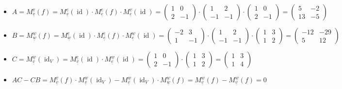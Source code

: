 \documentclass{article}
\newcommand{\id}{\operatorname{id}}
\begin{document}
\begin{enumerate}[(a)]
\begin{itemize}
                \item $A = M^{\underline{v}}_{\underline{v}}(f) = M^{\underline{e}}_{\underline{v}}(\id)\cdot M^{\underline{e}}_{\underline{e}}(f) \cdot M^{\underline{v}}_{\underline{e}}(\id)= \begin{pmatrix} 1 & 0 \\ 2 & -1\end{pmatrix} \cdot \begin{pmatrix} 1 & 2 \\ -1 & -1\end{pmatrix} \cdot \begin{pmatrix} 1 & 0 \\ 2 & -1\end{pmatrix} = \begin{pmatrix} 5 & -2 \\ 13 & -5\end{pmatrix}$
                \item $B = M^{\underline{w}}_{\underline{w}}(f) = M^{\underline{e}}_{\underline{w}}(\id)\cdot M^{\underline{e}}_{\underline{e}}(f) \cdot M^{\underline{w}}_{\underline{e}}(\id)= \begin{pmatrix} -2 & 3 \\ 1 & -1\end{pmatrix} \cdot \begin{pmatrix} 1 & 2 \\ -1 & -1\end{pmatrix} \cdot \begin{pmatrix} 1 & 3 \\ 1 & 2\end{pmatrix} = \begin{pmatrix} -12 & -29 \\ 5 & 12\end{pmatrix}$
                \item $C = M^{\underline{w}}_{\underline{v}}(\id_V) = M^{\underline{e}}_{\underline{v}}(\id)\cdot  M^{\underline{w}}_{\underline{e}}(\id)= \begin{pmatrix} 1 & 0 \\ 2 & -1\end{pmatrix} \cdot \begin{pmatrix} 1 & 3 \\ 1 & 2\end{pmatrix} = \begin{pmatrix} 1 & 3 \\ 1 & 4\end{pmatrix}$
                \item $AC - CB = M^{\underline{v}}_{\underline{v}}(f) \cdot M^{\underline{w}}_{\underline{v}}(\id_V) - M^{\underline{w}}_{\underline{v}}(\id_V) \cdot M^{\underline{w}}_{\underline{w}}(f) = M^{\underline{w}}_{\underline{v}}(f) - M^{\underline{w}}_{\underline{v}}(f) = 0$
            \end{itemize}
    \end{enumerate}
\end{document}
